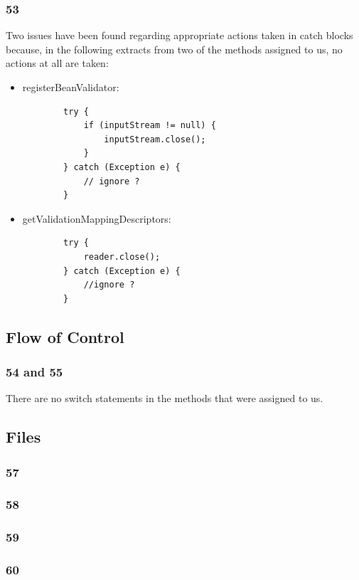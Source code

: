 \documentclass{article}
\begin{document}
\subsubsection{53}
Two issues have been found regarding appropriate actions 
taken in catch blocks because, in the following extracts
from two of the methods assigned to us, no actions at all
are taken:
\begin{itemize}
	\item registerBeanValidator: \\
	\begin{lstlisting}
		try {
	        if (inputStream != null) {
		        inputStream.close();
	        }
        } catch (Exception e) {
	        // ignore ?
        }
	\end{lstlisting}
	\item getValidationMappingDescriptors: \\
	\begin{lstlisting}
		try {
		    reader.close();
	    } catch (Exception e) {
		    //ignore ?
	    }
	\end{lstlisting}
\end{itemize}
\subsection{Flow of Control}
\subsubsection{54 and 55}
There are no switch statements in the methods that were assigned to us.
\subsection{Files} %
\subsubsection{57}
\subsubsection{58}
\subsubsection{59}
\subsubsection{60}
\end{document}
